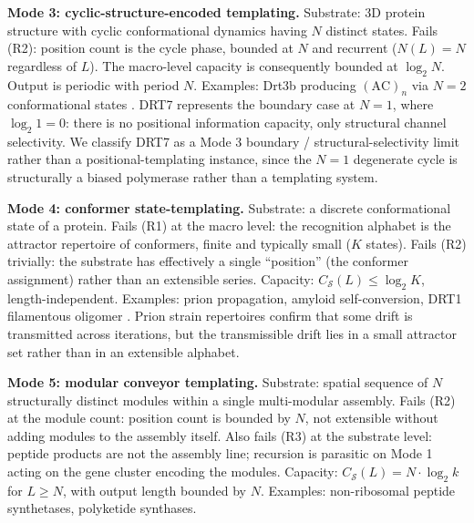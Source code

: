 \documentclass[aps,prx,reprint,amsmath,amssymb,floatfix,superscriptaddress,nofootinbib]{revtex4-2}
\theoremstyle{plain-thm}
\theoremstyle{definition-thm}
\newcommand{\Csub}{C_{\mathcal{S}}}
\begin{document}
\textbf{Mode 3: cyclic-structure-encoded templating.} Substrate: 3D protein structure with cyclic conformational dynamics having $N$ distinct states. Fails (R2): position count is the cycle phase, bounded at $N$ and recurrent ($N(L) = N$ regardless of $L$). The macro-level capacity is consequently bounded at $\log_2 N$. Output is periodic with period $N$. Examples: Drt3b producing $(\mathrm{AC})_n$ via $N=2$ conformational states \citep{Deng2026}. DRT7 represents the boundary case at $N=1$, where $\log_2 1 = 0$: there is no positional information capacity, only structural channel selectivity. We classify DRT7 as a Mode 3 boundary / structural-selectivity limit rather than a positional-templating instance, since the $N=1$ degenerate cycle is structurally a biased polymerase rather than a templating system.

\textbf{Mode 4: conformer state-templating.} Substrate: a discrete conformational state of a protein. Fails (R1) at the macro level: the recognition alphabet is the attractor repertoire of conformers, finite and typically small ($K$ states). Fails (R2) trivially: the substrate has effectively a single ``position'' (the conformer assignment) rather than an extensible series. Capacity: $\Csub(L) \le \log_2 K$, length-independent. Examples: prion propagation, amyloid self-conversion, DRT1 filamentous oligomer \citep{DRT1preprint2026}. Prion strain repertoires confirm that some drift is transmitted across iterations, but the transmissible drift lies in a small attractor set rather than in an extensible alphabet.

\textbf{Mode 5: modular conveyor templating.} Substrate: spatial sequence of $N$ structurally distinct modules within a single multi-modular assembly. Fails (R2) at the module count: position count is bounded by $N$, not extensible without adding modules to the assembly itself. Also fails (R3) at the substrate level: peptide products are not the assembly line; recursion is parasitic on Mode 1 acting on the gene cluster encoding the modules. Capacity: $\Csub(L) = N \cdot \log_2 k$ for $L \ge N$, with output length bounded by $N$. Examples: non-ribosomal peptide synthetases, polyketide synthases.
\end{document}
